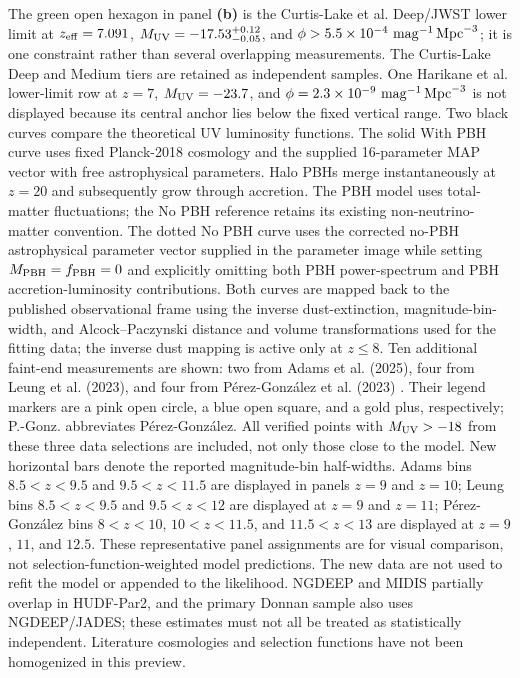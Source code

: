 {The green open hexagon in panel \textbf{(b)} is the Curtis-Lake et al.
Deep/JWST lower limit at $z_{\rm eff}=7.091$,
$M_{\rm UV}=-17.53^{+0.12}_{-0.05}$, and
$\phi>5.5\times10^{-4}\ {\rm mag}^{-1}\,{\rm Mpc}^{-3}$; it is one
constraint rather than several overlapping measurements.
The Curtis-Lake Deep and Medium tiers are retained as independent
samples. One Harikane et al. lower-limit row at $z=7$,
$M_{\rm UV}=-23.7$, and $\phi=2.3\times10^{-9}\
{\rm mag}^{-1}\,{\rm Mpc}^{-3}$ is not displayed because its central
anchor lies below the fixed vertical range. Two black curves compare the theoretical UV luminosity functions. The solid With PBH curve uses fixed Planck-2018 cosmology and the supplied 16-parameter MAP vector with free astrophysical parameters. Halo PBHs merge instantaneously at $z=20$ and subsequently grow through accretion. The PBH model uses total-matter fluctuations; the No PBH reference retains its existing non-neutrino-matter convention. The dotted No PBH curve uses the corrected no-PBH astrophysical parameter vector supplied in the parameter image while setting $M_{\rm PBH}=f_{\rm PBH}=0$ and explicitly omitting both PBH power-spectrum and PBH accretion-luminosity contributions. Both curves are mapped back to the published observational frame using the inverse dust-extinction, magnitude-bin-width, and Alcock--Paczynski distance and volume transformations used for the fitting data; the inverse dust mapping is active only at $z\leq8$. Ten additional faint-end measurements are shown: two from Adams et al. (2025),
four from Leung et al. (2023), and four from Pérez-González et al. (2023)
\citep{Adams2025MediumBands,Leung2023NGDEEP,PerezGonzalez2023MIDIS}.
Their legend markers are a pink open circle, a blue open square, and a gold plus,
respectively; P.-Gonz. abbreviates Pérez-González.
All verified points with $M_{\rm UV}>-18$ from these three data selections are included,
not only those close to the model. New horizontal bars denote the reported magnitude-bin half-widths.
Adams bins $8.5<z<9.5$ and $9.5<z<11.5$ are displayed in panels $z=9$ and $z=10$;
Leung bins $8.5<z<9.5$ and $9.5<z<12$ are displayed at $z=9$ and $z=11$;
Pérez-González bins $8<z<10$, $10<z<11.5$, and $11.5<z<13$ are displayed at $z=9$, $11$, and $12.5$.
These representative panel assignments are for visual comparison, not selection-function-weighted model predictions.
The new data are not used to refit the model or appended to the likelihood.
NGDEEP and MIDIS partially overlap in HUDF-Par2, and the primary Donnan sample also uses NGDEEP/JADES;
these estimates must not all be treated as statistically independent.
Literature cosmologies and selection functions have not been homogenized in this preview.}

